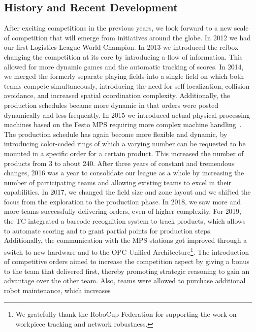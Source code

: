 \documentclass[12pt,twoside]{article}
\begin{document}
 \subsection{History and Recent Development}
 After exciting competitions in the previous years, we look forward to a new
 scale of competition that will emerge from initiatives around the globe. In
 2012 we had our first Logistics League World Champion.  In 2013 we introduced
 the \ac{refbox}~\cite{RCI-RefBox} changing the competition at its core
 by introducing a flow of information. This allowed for more dynamic games and
 the automatic tracking of scores.
 In 2014, we merged the formerly separate playing fields into a single field on
 which both teams compete simultaneously, introducing the need for
 self-localization, collision avoidance, and increased spatial coordination
 complexity.  Additionally, the production schedules became more dynamic in that
 orders were posted dynamically and less frequently. In 2015 we introduced
 actual physical processing machines based on the Festo
 \ac{MPS} requiring more complex machine handling~\cite{wdrl2013}. The
 production schedule has again become more flexible and dynamic, by introducing
 color-coded rings of which a varying number can be requested to be mounted in a
 specific order for a certain product.  This increased the number of products
 from 3 to about 240.  After three years of constant and tremendous changes,
 2016 was a year to consolidate our league as a whole by increasing the number
 of participating teams and allowing existing teams to excel in their
 capabilities.  In 2017, we changed the field size and zone layout and we
 shifted the focus from the exploration to the production phase. In 2018, we saw
 more and more teams successfully delivering orders, even of higher complexity.
 For 2019, the \ac{TC} integrated a barcode recognition system to track
 products, which allows to automate scoring and to grant partial points for
 production steps.
 Additionally, the communication with the \ac{MPS} stations got
 improved through a switch to new hardware and to the OPC Unified
 Architecture\footnote{We gratefully thank the RoboCup Federation for
 supporting the work on workpiece tracking and network robustness.}. The
 introduction of competitive orders aimed to increase the competition aspect by
 giving a bonus to the team that delivered first, thereby promoting strategic
 reasoning to gain an advantage over the other team.  Also, teams were allowed
 to purchase additional robot maintenance, which increases
\end{document}

